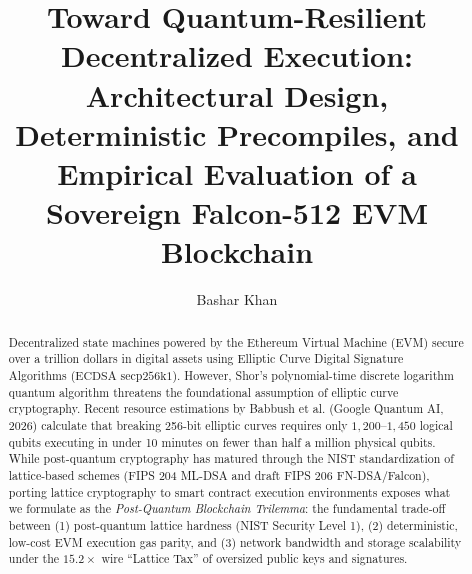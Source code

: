 \documentclass[a4paper,fleqn]{cas-dc}
\begin{document}
\let\WriteBookmarks\relax
\def\floatpagepagefraction{1}
\def\textpagefraction{.001}


\title [mode = title]{Toward Quantum-Resilient Decentralized Execution: Architectural Design, Deterministic Precompiles, and Empirical Evaluation of a Sovereign Falcon-512 EVM Blockchain}

\author[1]{Bashar Khan}
\cormark[1]

\address[1]{Department of Computer Science and Engineering, QR-DLT Research Lab}


\begin{abstract}
Decentralized state machines powered by the Ethereum Virtual Machine (EVM) secure over a trillion dollars in digital assets using Elliptic Curve Digital Signature Algorithms ($\text{ECDSA secp256k1}$). However, Shor's polynomial-time discrete logarithm quantum algorithm threatens the foundational assumption of elliptic curve cryptography. Recent resource estimations by Babbush et al. (Google Quantum AI, 2026) calculate that breaking 256-bit elliptic curves requires only $1,200\text{--}1,450$ logical qubits executing in under 10 minutes on fewer than half a million physical qubits. While post-quantum cryptography has matured through the NIST standardization of lattice-based schemes (FIPS 204 ML-DSA and draft FIPS 206 FN-DSA/Falcon), porting lattice cryptography to smart contract execution environments exposes what we formulate as the \emph{Post-Quantum Blockchain Trilemma}: the fundamental trade-off between (1) post-quantum lattice hardness (NIST Security Level 1), (2) deterministic, low-cost EVM execution gas parity, and (3) network bandwidth and storage scalability under the $15.2\times$ wire ``Lattice Tax'' of oversized public keys and signatures.


\end{abstract}
\end{document}
